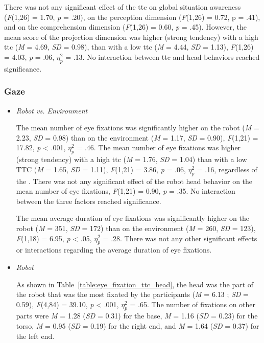 \documentclass[a4paper,11pt,twoside]{StyleThese}
\begin{document}
There was not any significant effect of the \acrshort{ttc} on global situation awareness (\textit{F}(1,26) = 1.70, \textit{p} = .20), on the perception dimension (\textit{F}(1,26) = 0.72, p = .41), and on the comprehension dimension (\textit{F}(1,26) = 0.60, \textit{p} = .45). However, the mean score of the projection dimension was higher (strong tendency) with a high \acrshort{ttc} (\textit{M} = 4.69, \textit{SD} = 0.98), than with a low \acrshort{ttc} (\textit{M} = 4.44, \textit{SD} = 1.13), \textit{F}(1,26) = 4.03, \textit{p} = .06, $\eta_{p}^{2}$ = .13. No interaction between \acrshort{ttc} and head behaviors reached significance.

\subsubsection{Gaze}
\begin{itemize}
\item  \textit{Robot vs. Environment}

The mean number of eye fixations was significantly higher on the robot (\textit{M} = 2.23, \textit{SD} = 0.98) than on the environment (\textit{M} = 1.17, \textit{SD} = 0.90), \textit{F}(1,21) = 17.82, \textit{p} < .001, $\eta_{p}^{2}$ = .46.
The mean number of eye fixations was higher (strong tendency) with a high \acrshort{ttc} (\textit{M} = 1.76, \textit{SD} =  1.04) than with a low TTC (\textit{M} = 1.65, \textit{SD} = 1.11), \textit{F}(1,21) = 3.86, \textit{p} = .06, $\eta_{p}^{2}$ = .16, regardless of the . There was not any significant effect of the robot head behavior on the mean number of eye fixations, \textit{F}(1,21) = 0.90, \textit{p} = .35. No interaction between the three factors reached significance.

The mean average duration of eye fixations was significantly higher on the robot (\textit{M} = 351, \textit{SD} =  172) than on the environment (\textit{M} = 260, \textit{SD} = 123), \textit{F}(1,18) = 6.95, \textit{p} < .05, $\eta_{p}^{2}$ = .28. There was not any other significant effects or interactions regarding the average duration of eye fixations.

\item \textit{Robot }

As shown in Table~\ref{table:eye_fixation_ttc_head}, the head was the part of the robot that was the most fixated by the participants (\textit{M} = 6.13 ; \textit{SD} = 0.59), \textit{F}(4,84) = 39.10, \textit{p} < .001, $\eta_{p}^{2}$ = .65. The number of fixations on other parts were \textit{M} = 1.28 (\textit{SD} = 0.31) for the base, \textit{M} = 1.16 (\textit{SD} = 0.23) for the torso, \textit{M} = 0.95 (\textit{SD} = 0.19) for the right end, and \textit{M} = 1.64 (\textit{SD} = 0.37) for the left end. 


\end{itemize}
\end{document}
